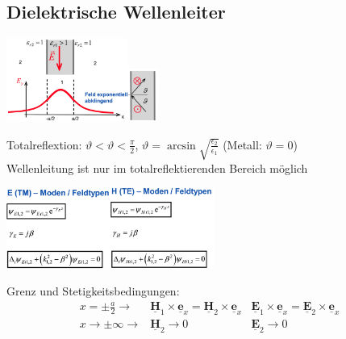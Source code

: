 \documentclass[english]{latex4ei/latex4ei_sheet}
\renewcommand{\vec}[1]{\underline{\boldsymbol{#1}}}
\begin{document}
\begin{sectionbox}
	\subsection{Dielektrische Wellenleiter}
	\begin{center}\includegraphics[width = 4cm]{./img/dielektr2.png}\includegraphics[width = 1cm]{./img/dielektr.png}\end{center}
	Totalreflextion: $\vartheta < \vartheta < \frac{\pi}{2}$, $\vartheta = \operatorname{arcsin}\sqrt{\frac{\epsilon_2}{\epsilon_1}}$ (Metall: $\vartheta = 0$)\\
	Wellenleitung ist nur im totalreflektierenden Bereich möglich\\
	\begin{center}\includegraphics[width = 3.4cm]{./img/dielektr-tm.png}\includegraphics[width = 3.4cm]{./img/dielektr-te.png}\end{center}
	Grenz und Stetigkeitsbedingungen:\\
	$$\begin{array}{lll}
		x=\pm \frac{a}{2} \rightarrow & \vec{H}_{1} \times \vec{e}_{x}=\vec{H}_{2} \times \vec{e}_{x} & \vec{E}_{1} \times \vec{e}_{x}=\vec{E}_{2} \times \vec{e}_{x} \\
		x \rightarrow \pm \infty \rightarrow & \vec{H}_{2} \rightarrow 0 & \vec{E}_{2} \rightarrow 0
		\end{array}$$

\end{sectionbox}
\end{document}
